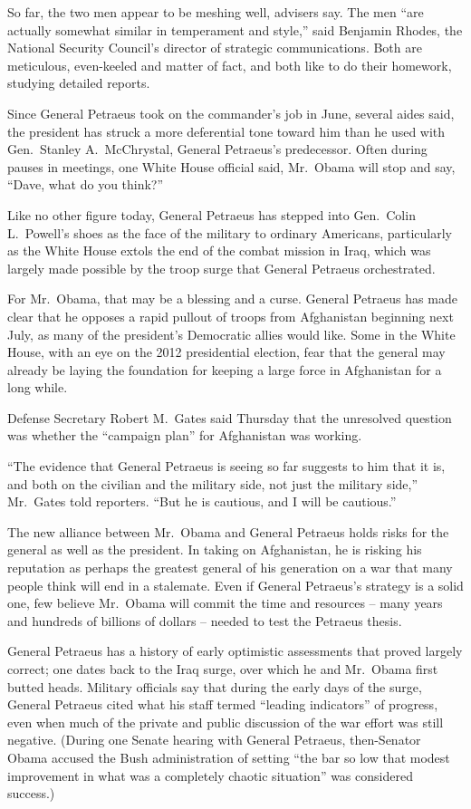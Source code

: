 ﻿\documentclass[12pt]{article}
\begin{document}
So far, the two men appear to be meshing well, advisers say. The men ``are actually somewhat similar
in temperament and style,'' said Benjamin Rhodes, the National Security Council's director of
strategic communications. Both are meticulous, even-keeled and matter of fact, and both like to do
their homework, studying detailed reports.

Since General Petraeus took on the commander's job in June, several aides said, the president has
struck a more deferential tone toward him than he used with Gen.~Stanley A.~McChrystal, General
Petraeus's predecessor. Often during pauses in meetings, one White House official said, Mr.~Obama
will stop and say, ``Dave, what do you think?''

Like no other figure today, General Petraeus has stepped into Gen.~Colin L.~Powell's shoes as the
face of the military to ordinary Americans, particularly as the White House extols the end of the
combat mission in Iraq, which was largely made possible by the troop surge that General Petraeus
orchestrated.

For Mr.~Obama, that may be a blessing and a curse. General Petraeus has made clear that he opposes a
rapid pullout of troops from Afghanistan beginning next July, as many of the president's Democratic
allies would like. Some in the White House, with an eye on the 2012 presidential election, fear that
the general may already be laying the foundation for keeping a large force in Afghanistan for a long
while.

Defense Secretary Robert M.~Gates said Thursday that the unresolved question was whether the
``campaign plan'' for Afghanistan was working.

``The evidence that General Petraeus is seeing so far suggests to him that it is, and both on the
civilian and the military side, not just the military side,'' Mr.~Gates told reporters. ``But he is
cautious, and I will be cautious.''

The new alliance between Mr.~Obama and General Petraeus holds risks for the general as well as the
president. In taking on Afghanistan, he is risking his reputation as perhaps the greatest general of
his generation on a war that many people think will end in a stalemate. Even if General Petraeus's
strategy is a solid one, few believe Mr.~Obama will commit the time and resources -- many years and
hundreds of billions of dollars -- needed to test the Petraeus thesis.

General Petraeus has a history of early optimistic assessments that proved largely correct; one
dates back to the Iraq surge, over which he and Mr.~Obama first butted heads. Military officials say
that during the early days of the surge, General Petraeus cited what his staff termed ``leading
indicators'' of progress, even when much of the private and public discussion of the war effort was
still negative. (During one Senate hearing with General Petraeus, then-Senator Obama accused the
Bush administration of setting ``the bar so low that modest improvement in what was a completely
chaotic situation'' was considered success.)
\end{document}
